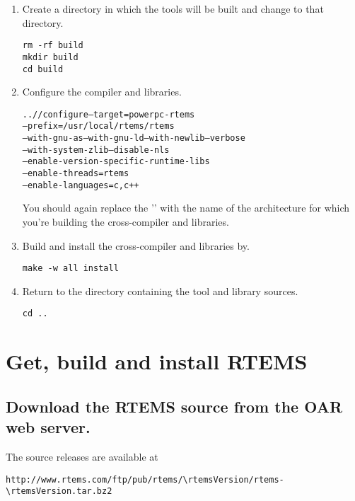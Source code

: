 \documentclass{report}
\begin{document}
\begin{enumerate}
\item Create a directory in which the tools will be built and
change to that directory.
\begin{verbatim}
rm -rf build
mkdir build
cd build
\end{verbatim}

\item Configure the compiler and libraries.
\begin{alltt}
../\GCC/configure --target=powerpc-rtems\rtemsVersion \verb@\@
            --prefix=/usr/local/rtems/rtems\rtemsVersion \verb@\@
            --with-gnu-as --with-gnu-ld --with-newlib --verbose \verb@\@
            --with-system-zlib --disable-nls \verb@\@
            --enable-version-specific-runtime-libs \verb@\@
            --enable-threads=rtems \verb@\@
            --enable-languages=c,c++ 
\end{alltt}
You should again replace the '\verb@powerpc@' with the name of the architecture
for which you're
building the cross-compiler and libraries.

\item Build and install the cross-compiler and libraries by.
\begin{verbatim}
make -w all install
\end{verbatim}

\item Return to the directory containing the tool and library sources.
\begin{verbatim}
cd ..
\end{verbatim}
\end{enumerate}



\section{Get, build and install RTEMS}
\subsection {Download the RTEMS source from the OAR web server.}

The source releases are available at

\begin{verbatim}
http://www.rtems.com/ftp/pub/rtems/\rtemsVersion/rtems-\rtemsVersion.tar.bz2
\end{verbatim}
\end{document}
